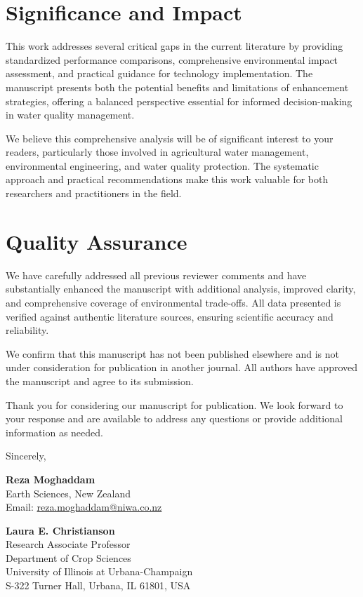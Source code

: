 \documentclass[12pt,a4paper]{article}
\begin{document}
\section*{Significance and Impact}

This work addresses several critical gaps in the current literature by providing standardized performance comparisons, comprehensive environmental impact assessment, and practical guidance for technology implementation. The manuscript presents both the potential benefits and limitations of enhancement strategies, offering a balanced perspective essential for informed decision-making in water quality management.

We believe this comprehensive analysis will be of significant interest to your readers, particularly those involved in agricultural water management, environmental engineering, and water quality protection. The systematic approach and practical recommendations make this work valuable for both researchers and practitioners in the field.

\section*{Quality Assurance}

We have carefully addressed all previous reviewer comments and have substantially enhanced the manuscript with additional analysis, improved clarity, and comprehensive coverage of environmental trade-offs. All data presented is verified against authentic literature sources, ensuring scientific accuracy and reliability.

We confirm that this manuscript has not been published elsewhere and is not under consideration for publication in another journal. All authors have approved the manuscript and agree to its submission.

\vspace{0.5cm}

Thank you for considering our manuscript for publication. We look forward to your response and are available to address any questions or provide additional information as needed.

\vspace{1cm}

\noindent Sincerely,

\vspace{1.5cm}

\noindent \textbf{Reza Moghaddam}\\
Earth Sciences, New Zealand\\
Email: \href{mailto:reza.moghaddam@niwa.co.nz}{reza.moghaddam@niwa.co.nz}

\vspace{1cm}

\noindent \textbf{Laura E. Christianson}\\
Research Associate Professor\\
Department of Crop Sciences\\
University of Illinois at Urbana-Champaign\\
S-322 Turner Hall, Urbana, IL 61801, USA
\end{document}
